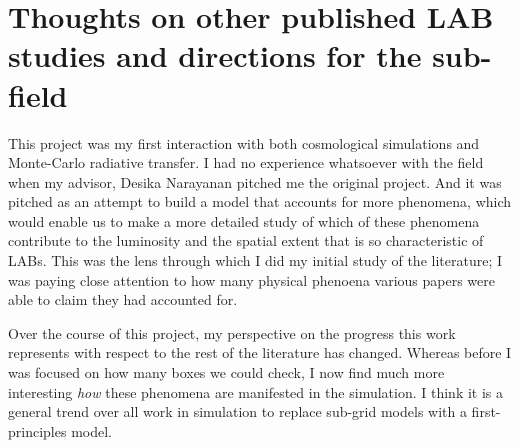 \chapter{Thoughts on other published LAB studies and directions for the sub-field}
\label{literature}

This project was my first interaction with both cosmological simulations and Monte-Carlo radiative transfer.
I had no experience whatsoever with the field when my advisor, Desika Narayanan pitched me the original project.
And it was pitched as an attempt to build a model that accounts for more phenomena, which would enable us to make a more detailed study of which of these phenomena contribute to the luminosity and the spatial extent that is so characteristic of LABs.
This was the lens through which I did my initial study of the literature; I was paying close attention to how many physical phenoena various papers were able to claim they had accounted for.

Over the course of this project, my perspective on the progress this work represents with respect to the rest of the literature has changed.
Whereas before I was focused on how many boxes we could check, I now find much more interesting \emph{how} these phenomena are manifested in the simulation.
I think it is a general trend over all work in simulation to replace sub-grid models with a first-principles model.
